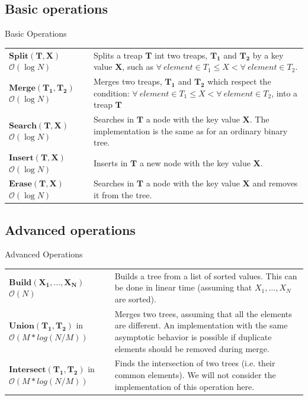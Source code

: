 \documentclass[10pt]{beamer}
\begin{document}
\subsection{Basic operations}
\begin{frame}
	Basic Operations	

		\begin{tabular}{@{} R{.2\linewidth} L{.7\linewidth}  @{}}
	  $\mathbf{Split(T,X)}$ $\mathcal{O}(\log N)$ &  Splits a treap \textbf{T} int two treaps, $\mathbf{T_1}$ and $\mathbf{T_2}$ 
	  by a key value $\mathbf{X}$, such as $\forall\ element \in T_1 \leq X < \forall\ element \in T_2$.\\
	 
	  $\mathbf{Merge(T_1,T_2)}$ $\mathcal{O}(\log N)$ & 
	 Merges two treaps, $\mathbf{T_1}$ and $\mathbf{T_2}$ which respect the condition: $\forall\ element \in T_1 \leq X < \forall\ element \in T_2$, into a treap $\mathbf{T}$\\

	  $\mathbf{Search(T,X)}$   $\mathcal{O}(\log N)$ &
	   Searches in $\mathbf{T}$ a node with the key value $\mathbf{X}$. The implementation is the same as for an ordinary binary tree. \\

	  $\mathbf{Insert(T,X)}$ $\mathcal{O}(\log N)$ &
	   Inserts in $\mathbf{T}$ a new node with the key value $\mathbf{X}$. \\

	  $\mathbf{Erase(T,X)}$ $\mathcal{O}(\log N)$ &
	   Searches in $\mathbf{T}$ a node with the key value $\mathbf{X}$ and removes it from the tree.
		\end{tabular}
	
\end{frame}

\subsection{Advanced operations}
\begin{frame}

	Advanced Operations	

		\begin{tabular}{@{} R{.2\linewidth} L{.7\linewidth}  @{}}

	$\mathbf{Build (X_1, ..., X_N)}$ $\mathcal{O}(N)$ &
	   Builds a tree from a list of sorted values. This can be done in linear time (assuming that $X_1,...,X_N$ are sorted).\\
	  $\mathbf{Union (T_1, T_2)}$ in $\mathcal{O}(M*log(N/M))$ &
 Merges two trees, assuming that all the elements are different. 
 An implementation with the same asymptotic behavior is possible if duplicate elements should be removed during merge.\\
	  $\mathbf{Intersect (T_1, T_2)}$ in $\mathcal{O}(M*log(N/M))$ &
 Finds the intersection of two trees (i.e. their common elements). We will not consider the implementation of this operation here.
		\end{tabular}

		
	\end{frame}
\end{document}

